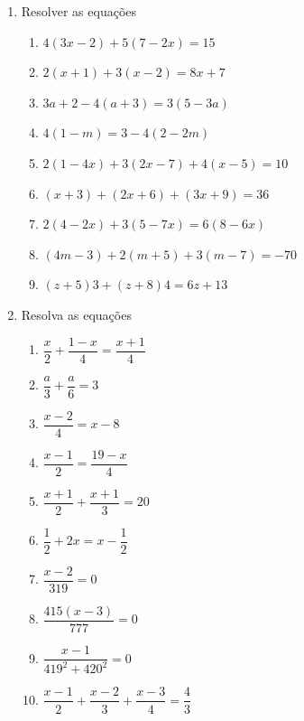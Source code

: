 \documentclass[a4paper,12pt]{article}
\begin{document}
\begin{enumerate}
			\item Resolver as equações
			\begin{enumerate}[label=(\alph*), noitemsep]
				\item $4(3x-2)+5(7-2x)=15$
				\item $2(x+1)+3(x-2)=8x+7$
				\item $3a+2-4(a+3)=3(5-3a)$
				\item $4(1-m)=3-4(2-2m)$
				\item $2(1-4x)+3(2x-7)+4(x-5)=10$
				\item $(x+3)+(2x+6)+(3x+9)=36$
				\item $2(4-2x)+3(5-7x)=6(8-6x)$
				\item $(4m-3)+2(m+5)+3(m-7)=-70$
				\item $(z+5)3+(z+8)4=6z+13$
			\end{enumerate}

			\item Resolva as equações
			
			
			\begin{enumerate}[label=(\alph*), itemsep=1em]
				\item $\dfrac{x}{2}+\dfrac{1-x}{4}=\dfrac{x+1}{4}$
				\item $\dfrac{a}{3}+\dfrac{a}{6}=3$
				\item $\dfrac{x-2}{4}=x-8$
				\item $\dfrac{x-1}{2}=\dfrac{19-x}{4}$
				\item $\dfrac{x+1}{2}+\dfrac{x+1}{3}=20$
				\item $\dfrac{1}{2}+2x=x-\dfrac{1}{2}$
				\item $\dfrac{x-2}{319}=0$
				\item $\dfrac{415(x-3)}{777}=0$
				\item $\dfrac{x-1}{419^{2}+420^{2}}=0$
				\item $\dfrac{x-1}{2}+\dfrac{x-2}{3}+\dfrac{x-3}{4}=\dfrac{4}{3}$
			\end{enumerate}

			


		\end{enumerate}
	
\end{document}

